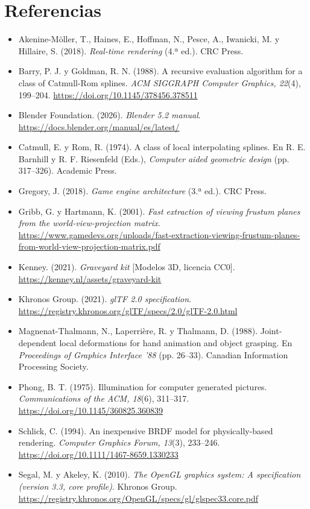 \documentclass[letter,12pt]{article}
\begin{document}
	\section{Referencias}
	\begin{itemize}[leftmargin=*]
		\item Akenine-Möller, T., Haines, E., Hoffman, N., Pesce, A., Iwanicki, M. y Hillaire, S. (2018). \textit{Real-time rendering} (4.ª ed.). CRC Press.
		\item Barry, P. J. y Goldman, R. N. (1988). A recursive evaluation algorithm for a class of Catmull-Rom splines. \textit{ACM SIGGRAPH Computer Graphics, 22}(4), 199--204. \url{https://doi.org/10.1145/378456.378511}
		\item Blender Foundation. (2026). \textit{Blender 5.2 manual}. \url{https://docs.blender.org/manual/es/latest/}
		\item Catmull, E. y Rom, R. (1974). A class of local interpolating splines. En R. E. Barnhill y R. F. Riesenfeld (Eds.), \textit{Computer aided geometric design} (pp. 317--326). Academic Press.
		\item Gregory, J. (2018). \textit{Game engine architecture} (3.ª ed.). CRC Press.
		\item Gribb, G. y Hartmann, K. (2001). \textit{Fast extraction of viewing frustum planes from the world-view-projection matrix}. \url{https://www.gamedevs.org/uploads/fast-extraction-viewing-frustum-planes-from-world-view-projection-matrix.pdf}
		\item Kenney. (2021). \textit{Graveyard kit} [Modelos 3D, licencia CC0]. \url{https://kenney.nl/assets/graveyard-kit}
		\item Khronos Group. (2021). \textit{glTF 2.0 specification}. \url{https://registry.khronos.org/glTF/specs/2.0/glTF-2.0.html}
		\item Magnenat-Thalmann, N., Laperrière, R. y Thalmann, D. (1988). Joint-dependent local deformations for hand animation and object grasping. En \textit{Proceedings of Graphics Interface '88} (pp. 26--33). Canadian Information Processing Society.
		\item Phong, B. T. (1975). Illumination for computer generated pictures. \textit{Communications of the ACM, 18}(6), 311--317. \url{https://doi.org/10.1145/360825.360839}
		\item Schlick, C. (1994). An inexpensive BRDF model for physically-based rendering. \textit{Computer Graphics Forum, 13}(3), 233--246. \url{https://doi.org/10.1111/1467-8659.1330233}
		\item Segal, M. y Akeley, K. (2010). \textit{The OpenGL graphics system: A specification (version 3.3, core profile)}. Khronos Group. \url{https://registry.khronos.org/OpenGL/specs/gl/glspec33.core.pdf}

\end{itemize}
\end{document}
